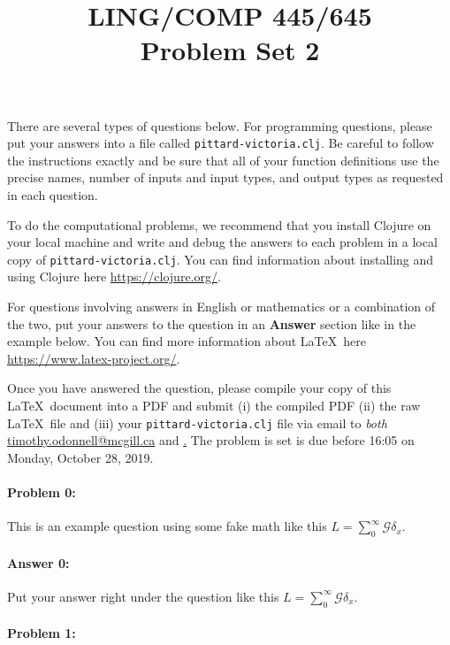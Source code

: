 \documentclass[10pt]{article}
\begin{document}
 
\title{LING/COMP 445/645\\Problem Set 2}
\date{}
\maketitle


There are several types of questions below. For programming questions,
please put your answers into a file called
\texttt{pittard-victoria.clj}. Be careful to follow the instructions
exactly and be sure that all of your function definitions use the
precise names, number of inputs and input types, and output types as
requested in each question.

To do the computational problems, we recommend that you install
Clojure on your local machine and write and debug the answers to each
problem in a local copy of \texttt{pittard-victoria.clj}. You can
find information about installing and using Clojure here
\url{https://clojure.org/}.

For questions involving answers in English or mathematics or a
combination of the two, put your answers to the question in an
\textbf{Answer} section like in the example below. You can find more
information about \LaTeX\ here \url{https://www.latex-project.org/}.

Once you have answered the question, please compile your copy of this
\LaTeX\ document into a PDF and submit (i) the compiled PDF (ii) the
raw \LaTeX\ file and (iii) your \texttt{pittard-victoria.clj} file
via email to \emph{both}
\href{mailto:timothy.odonnell@mcgill.ca}{timothy.odonnell@mcgill.ca}
and
\href{mailto:savanna.willerton@mail.mcgill.ca}\href{savanna.willerton@mail.mcgill.ca}.
The problem is set is due before 16:05 on Monday, October 28, 2019.

\hrulefill
\paragraph{Problem 0:}
This is an example question using some fake math like this
$L=\sum_0^{\infty} \mathcal{G} \delta_x$.

\paragraph{Answer 0:} Put your answer right under the question like
this $L=\sum_0^{\infty} \mathcal{G} \delta_x$.

\hrulefill
\paragraph{Problem 1:}
\end{document}
